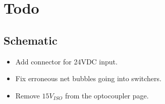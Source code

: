 \section{Todo}
\subsection{Schematic}
\begin{itemize}
    \item Add connector for 24VDC input.
    \item Fix erroneous net bubbles going into switchers.
    \item Remove $15V_{ISO}$ from the optocoupler page.
\end{itemize}

